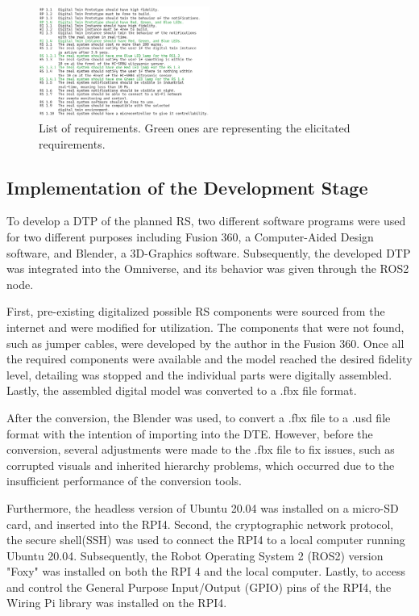 \documentclass[conference]{IEEEtran}
\begin{document}
    \begin{figure}[htbp]
        \centering
        \includegraphics[width=0.50\textwidth]{Requirements.png}
        \caption{List of requirements. Green ones are representing the elicitated requirements.}\label{fig:Requirements}
    \end{figure}

    \subsection{Implementation of the Development Stage}

    To develop a DTP of the planned RS, two different software programs were used for two different purposes including Fusion 360, a 
    Computer-Aided Design software, and Blender, a 3D-Graphics software. Subsequently, the developed DTP was integrated into the Omniverse, 
    and its behavior was given through the ROS2 node.

    First, pre-existing digitalized possible RS components were sourced from the internet and were modified for utilization. 
    The components that were not found, such as jumper cables, were developed by the author in the Fusion 360. Once all the required components 
    were available and the model reached the desired fidelity level, 
    detailing was stopped and the individual parts were digitally assembled. Lastly, the assembled digital model was converted to a .fbx file format.
    
    After the conversion, the Blender was used, to convert a .fbx file to a .usd file format with the intention of importing into the DTE. However, before the conversion, 
    several adjustments were made to the .fbx file to fix issues, such as corrupted visuals and inherited hierarchy problems, which occurred due to the insufficient performance of the conversion tools. 

    Furthermore, the headless version of  Ubuntu 20.04 was installed on a micro-SD card, and inserted into the RPI4. Second, the cryptographic network protocol, the secure shell(SSH) 
    was used to connect the RPI4 to a local computer running Ubuntu 20.04. Subsequently, the Robot Operating System 2 (ROS2) version "Foxy" was installed on both the RPI 4 and the local computer. 
    Lastly, to access and control the General Purpose Input/Output (GPIO) pins of the RPI4, the Wiring Pi library was installed on the RPI4.
\end{document}
